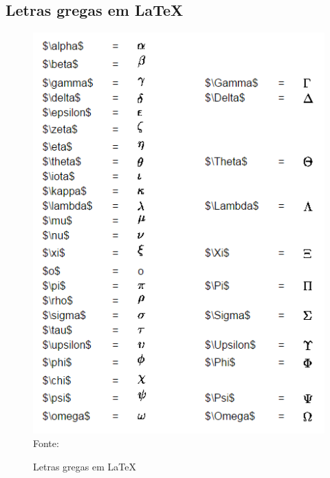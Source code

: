 \begin{anexosenv}
\chapter{Letras gregas em \LaTeX}
\begin{figure}[H]
	\begin{center}
		\caption{\label{fig_anexod}Letras gregas em \LaTeX}
		\includegraphics[scale=1.0]{USPSC-img/USPSC-LetrasGregas.png} \\
		Fonte: 
	\end{center}	
\end{figure}

\end{anexosenv}

